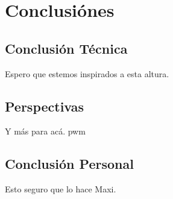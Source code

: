 \chapter{Conclusiónes}
\label{ch:conclusiones}

\section{Conclusión Técnica}
\label{sec:ConclusionTecnica}
Espero que estemos inspirados a esta altura. \cite{Gardner}


\section{Perspectivas}
\label{sec:Perspectivas}
Y más para acá. \gls{pwm}

\section{Conclusión Personal}
\label{sec:ConclusionPersonal}
Esto seguro que lo hace Maxi.